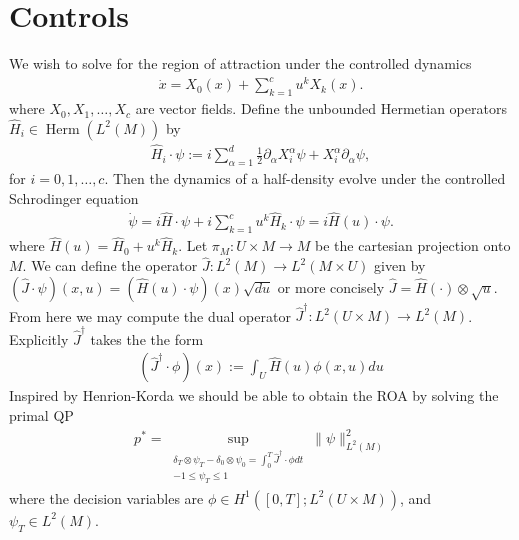 \documentclass[12pt]{amsart}
\DeclareMathOperator{\Herm}{Herm}
\begin{document}
\section{Controls}
We wish to solve for the region of attraction under the controlled dynamics
\begin{align*}
	\dot{x} = X_0(x) + \sum_{k=1}^{c} u^k X_k(x).
\end{align*}
where $X_0,X_1,\dots,X_c$ are vector fields.
Define the unbounded Hermetian operators $\hat{H}_i \in \Herm(L^2(M) )$ by
\begin{align*}
	\hat{H}_i \cdot \psi := i \sum_{\alpha=1}^d   \frac{1}{2} \partial_\alpha X_i^\alpha  \psi + X_i^\alpha \partial_\alpha \psi,
\end{align*}
for $i=0,1,\dots,c$.
Then the dynamics of a half-density evolve under the controlled Schrodinger equation
\begin{align*}
	\dot{\psi} = i \hat{H} \cdot \psi + i \sum_{k=1}^c u^k \hat{H}_k \cdot \psi = i \hat{H}(u) \cdot \psi.
\end{align*}
where $\hat{H}(u) = \hat{H}_0 + u^k \hat{H}_k$.
Let $\pi_M : U \times M \to M$ be the cartesian projection onto $M$.
We can define the operator $\hat{J} : L^2(M) \to L^2(M \times U)$ given by $(\hat{J} \cdot \psi )(x,u)= (\hat{H}(u) \cdot \psi)(x) \sqrt{du}$
or more concisely $\hat{J} = \hat{H}(\cdot) \otimes \sqrt{u}$.
From here we may compute the dual operator $\hat{J}^\dagger : L^2( U \times M) \to L^2(M)$.
Explicitly $\hat{J}^\dagger$ takes the the form
\begin{align*}
	(\hat{J}^\dagger \cdot \phi )(x) :=  \int_U \hat{H}(u) \phi(x,u) du
\end{align*}
Inspired by Henrion-Korda we should be able to obtain the ROA by solving the primal QP
\begin{align*}
	p^* = \sup_{
		\substack{ \delta_T \otimes \psi_T - \delta_0 \otimes \psi_0 = \int_{0}^T \hat{J}^\dagger \cdot \phi dt \\ -1 \leq \psi_T \leq 1  }}
			 \| \psi \|_{L^2(M)}^2
\end{align*}
where the decision variables are $\phi \in H^1( [0,T] ; L^2(U \times M) )$, and $\psi_T  \in L^2(M)$.



\end{document}
